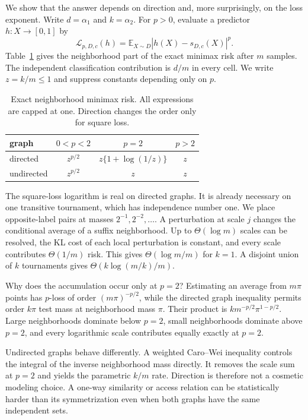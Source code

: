 \documentclass{article}
\theoremstyle{definition}
\theoremstyle{remark}
\newcommand{\E}{\mathbb E}
\newcommand{\risk}{\mathcal L}
\begin{document}
We show that the answer depends on direction and, more surprisingly, on the loss exponent. Write $d=\alpha_1$ and $k=\alpha_2$. For $p>0$, evaluate a predictor $h:X\to[0,1]$ by \[ \risk_{p,D,c}(h)=\E_{X\sim D}|h(X)-s_{D,c}(X)|^p. \] Table~\ref{tab:phase} gives the neighborhood part of the exact minimax risk after $m$ samples. The independent classification contribution is $d/m$ in every cell. We write $z=k/m\leq1$ and suppress constants depending only on $p$.

\begin{table}[t]
\centering
\caption{Exact neighborhood minimax risk. All expressions are capped at one. Direction changes the order only for square loss.}
\label{tab:phase}
\begin{tabular}{@{}lccc@{}}
\toprule
graph & $0<p<2$ & $p=2$ & $p>2$ \\
\midrule
directed & $z^{p/2}$ & $z\{1+\log(1/z)\}$ & $z$ \\
undirected & $z^{p/2}$ & $z$ & $z$ \\
\bottomrule
\end{tabular}
\end{table}

The square-loss logarithm is real on directed graphs. It is already necessary on one transitive tournament, which has independence number one. We place opposite-label pairs at masses $2^{-1},2^{-2},\ldots$. A perturbation at scale $j$ changes the conditional average of a suffix neighborhood. Up to $\Theta(\log m)$ scales can be resolved, the KL cost of each local perturbation is constant, and every scale contributes $\Theta(1/m)$ risk. This gives $\Theta(\log m/m)$ for $k=1$. A disjoint union of $k$ tournaments gives $\Theta(k\log(m/k)/m)$.

Why does the accumulation occur only at $p=2$? Estimating an average from $m\pi$ points has $p$-loss of order $(m\pi)^{-p/2}$, while the directed graph inequality permits order $k\pi$ test mass at neighborhood mass $\pi$. Their product is $k m^{-p/2}\pi^{1-p/2}$. Large neighborhoods dominate below $p=2$, small neighborhoods dominate above $p=2$, and every logarithmic scale contributes equally exactly at $p=2$.

Undirected graphs behave differently. A weighted Caro--Wei inequality controls the integral of the inverse neighborhood mass directly. It removes the scale sum at $p=2$ and yields the parametric $k/m$ rate. Direction is therefore not a cosmetic modeling choice. A one-way similarity or access relation can be statistically harder than its symmetrization even when both graphs have the same independent sets.
\end{document}
